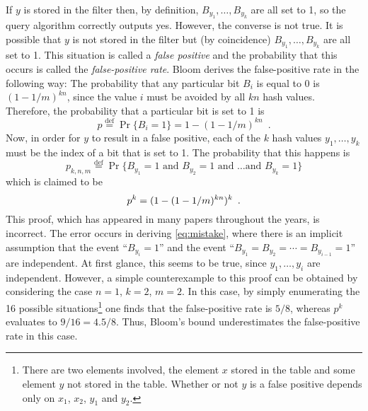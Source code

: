 \documentclass[lotsofwhite]{patmorin}
\begin{document}
If $y$ is stored in the filter then, by definition,
$B_{y_1},\ldots,B_{y_k}$ are all set to 1, so the query algorithm
correctly outputs yes.  However, the converse is not true.  It is
possible that $y$ is not stored in the filter but (by coincidence)
$B_{y_1},\ldots,B_{y_k}$ are all set to 1.  This situation is called a
\emph{false positive} and the probability that this occurs is called
the \emph{false-positive rate}.  Bloom derives the false-positive rate
in the following way: The probability that any particular bit $B_i$ is
equal to 0 is $(1-1/m)^{kn}$, since the value $i$ must be avoided by
all $kn$ hash values.   Therefore, the probability that a particular
bit is set to 1 is 
\[
	p\stackrel{\mathrm{def}}{=}\Pr\{B_i=1\}=1-(1-1/m)^{kn} \enspace .
\]
Now, in order for $y$ to result in a false positive, each of the $k$
hash values $y_1,\ldots,y_k$ must be the index of a bit that is set to
1.  The probability that this happens is 
\[
	p_{k,n,m} \stackrel{\mathrm{def}}{=} 
	\Pr\{\mbox{$B_{y_1}=1$ and $B_{y_2}=1$ and \ldots and $B_{y_k}=1$}\}
\]
which is claimed to be
\begin{equation}         
	p^k = (1-(1-1/m)^{kn})^k \enspace .  \eqlabel{mistake}
\end{equation}
This proof, which has appeared in many papers
throughout the years, is incorrect.  The error occurs in deriving
\eqref{eq:mistake}, where there is an implicit assumption that the
event ``$B_{y_i}=1$'' and the event ``$B_{y_1}=B_{y_2}=\cdots
=B_{y_{i-1}}=1$'' are independent.  At first glance, this seems to be
true, since $y_1,\ldots,y_i$ are independent.  However, a simple
counterexample to this proof can be obtained by considering the case
$n=1$, $k=2$, $m=2$.  In this case, by simply enumerating the 16
possible situations\footnote{There are two elements involved, the
element $x$ stored in the table and some element $y$ not stored in the
table.  Whether or not $y$ is a false positive depends only on $x_1$,
$x_2$, $y_1$ and $y_2$.} one finds that the false-positive rate is
$5/8$, whereas $p^k$ evaluates to $9/16=4.5/8$.  Thus,
Bloom's bound underestimates the false-positive rate in this case.
\end{document}

